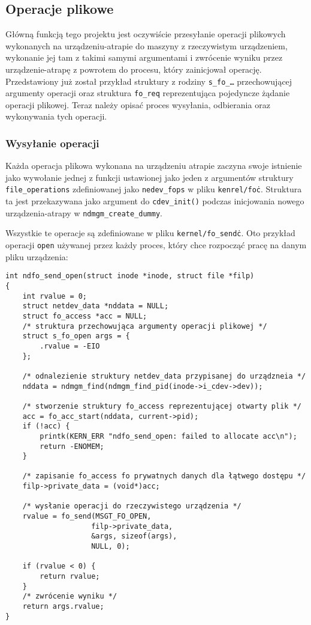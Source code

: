 \documentclass[10pt]{article}
\begin{document}
\subsection{Operacje plikowe}
\label{foops}

Główną funkcją tego projektu jest oczywiście przesyłanie operacji plikowych wykonanych na urządzeniu-atrapie do maszyny z rzeczywistym urządzeniem, wykonanie jej tam z takimi samymi argumentami i zwrócenie wyniku przez urządzenie-atrapę z powrotem do procesu, który zainicjował operację. Przedstawiony już został przykład struktury z rodziny \texttt{s\_fo\_\ldots} przechowującej argumenty operacji oraz struktura \texttt{fo\_req} reprezentująca pojedyncze żądanie operacji plikowej.  Teraz należy opisać proces wysyłania, odbierania oraz wykonywania tych operacji.

\subsubsection{Wysyłanie operacji}
\label{fosend}

Każda operacja plikowa wykonana na urządzeniu atrapie zaczyna swoje istnienie jako wywołanie jednej z funkcji ustawionej jako jeden z argumentów struktury \texttt{file\_operations} zdefiniowanej jako \texttt{nedev\_fops} w pliku \texttt{kenrel/fo\.c}. Struktura ta jest przekazywana jako argument do \texttt{cdev\_init()} podczas inicjowania nowego urządzenia-atrapy w \texttt{ndmgm\_create\_dummy}.

Wszystkie te operacje są zdefiniowane w pliku \texttt{kernel/fo\_send\.c}. Oto przykład operacji \texttt{open} używanej przez każdy proces, który chce rozpocząć pracę na danym pliku urządzenia:

\begin{verbatim}
int ndfo_send_open(struct inode *inode, struct file *filp)
{
    int rvalue = 0;
    struct netdev_data *nddata = NULL;
    struct fo_access *acc = NULL;
    /* struktura przechowująca argumenty operacji plikowej */
    struct s_fo_open args = {
        .rvalue = -EIO
    };

    /* odnalezienie struktury netdev_data przypisanej do urządzneia */
    nddata = ndmgm_find(ndmgm_find_pid(inode->i_cdev->dev));

    /* stworzenie struktury fo_access reprezentującej otwarty plik */
    acc = fo_acc_start(nddata, current->pid);
    if (!acc) {
        printk(KERN_ERR "ndfo_send_open: failed to allocate acc\n");
        return -ENOMEM;
    }

    /* zapisanie fo_access fo prywatnych danych dla łątwego dostępu */
    filp->private_data = (void*)acc;

    /* wysłanie operacji do rzeczywistego urządzenia */
    rvalue = fo_send(MSGT_FO_OPEN,
                    filp->private_data,
                    &args, sizeof(args),
                    NULL, 0);

    if (rvalue < 0) {
        return rvalue;
    }
    /* zwrócenie wyniku */
    return args.rvalue;
}
\end{verbatim}
\end{document}
